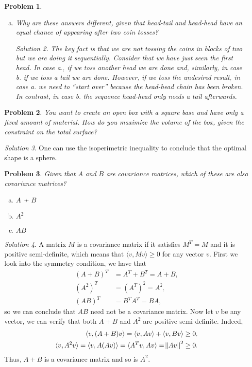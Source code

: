 \documentclass[12pt, letterpaper]{amsart}
\numberwithin{equation}{section} %
\newtheorem{problem}{Problem}
\theoremstyle{definition}
\theoremstyle{remark}
\newtheorem*{solution}{Solution}
\begin{document}
\begin{problem}
\begin{enumerate}[a.]
\begin{solution}
which gives 4 tosses for a fair coin.
\end{solution}
\item Why are these answers different, given that head-tail and head-head have an equal chance of appearing after two coin tosses?
\begin{solution}
The key fact is that we are not tossing the coins in blocks of two but we are doing it sequentially. Consider that we have just seen the first head. In case a., if we toss another head we are done and, similarly, in case b. if we toss a tail we are done. However, if we toss the undesired result, in case a. we need to ``start over'' because the head-head chain has been broken. In contrast, in case b. the sequence head-head only needs a tail afterwards. 
\end{solution}
\end{enumerate}
\end{problem}


\begin{problem}
You want to create an open box with a square base and have only a fixed amount of material. How do you maximize the volume of the box, given the constraint on the total surface?
\end{problem}
\begin{solution}
One can use the isoperimetric inequality to conclude that the optimal shape is a sphere.
\end{solution}


\begin{problem}
Given that $A$ and $B$ are covariance matrices, which of these are also covariance matrices?
\begin{enumerate}[a.]
\item $A$ + $B$
\item $A^2$
\item $AB$
\end{enumerate}
\end{problem}
\begin{solution}
A matrix $M$ is a covariance matrix if it satisfies $M^T=M$ and it is positive semi-definite, which means that $\langle v, Mv\rangle \geq 0$ for any vector $v$. First we look into the symmetry condition, we have that 
\begin{align*}
(A+B)^T &= A^T + B^T =  A + B,\\
(A^2)^T &= (A^T)^2 = A^2,\\
(AB)^T &= B^T A^T = BA,
\end{align*}
so we can conclude that $AB$ need not be a covariance matrix. Now let $v$ be any vector, we can verify that both $A + B$ and $A^2$ are positive semi-definite. Indeed,
\begin{align*}
\langle v, (A + B)v\rangle = \langle v, Av\rangle + \langle v, Bv\rangle \geq 0,\\
\langle v, A^2v\rangle = \langle v, A(Av)\rangle = \langle A^Tv, Av\rangle = \norm{Av}^2 \geq 0.
\end{align*}
Thus, $A+B$ is a covariance matrix and so is $A^2$.

\end{solution}
\end{document}

